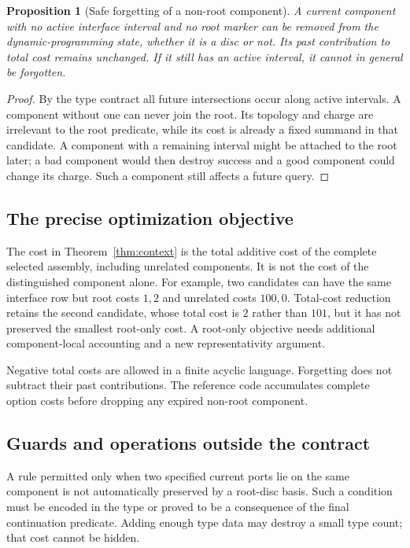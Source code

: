 \documentclass[11pt,letterpaper]{article}
\newtheorem{proposition}[theorem]{Proposition}
\theoremstyle{definition}
\begin{document}
\begin{proposition}[Safe forgetting of a non-root component]\label{prop:forget}
A current component with no active interface interval and no root marker can be removed from the dynamic-programming state, whether it is a disc or not. Its past contribution to total cost remains unchanged. If it still has an active interval, it cannot in general be forgotten.
\end{proposition}
\begin{proof}
By the type contract all future intersections occur along active intervals. A component without one can never join the root. Its topology and charge are irrelevant to the root predicate, while its cost is already a fixed summand in that candidate. A component with a remaining interval might be attached to the root later; a bad component would then destroy success and a good component could change its charge. Such a component still affects a future query.
\end{proof}

\subsection{The precise optimization objective}
The cost in Theorem~\ref{thm:context} is the total additive cost of the complete selected assembly, including unrelated components. It is not the cost of the distinguished component alone. For example, two candidates can have the same interface row but root costs $1,2$ and unrelated costs $100,0$. Total-cost reduction retains the second candidate, whose total cost is $2$ rather than $101$, but it has not preserved the smallest root-only cost. A root-only objective needs additional component-local accounting and a new representativity argument.

Negative total costs are allowed in a finite acyclic language. Forgetting does not subtract their past contributions. The reference code accumulates complete option costs before dropping any expired non-root component.

\subsection{Guards and operations outside the contract}
A rule permitted only when two specified current ports lie on the same component is not automatically preserved by a root-disc basis. Such a condition must be encoded in the type or proved to be a consequence of the final continuation predicate. Adding enough type data may destroy a small type count; that cost cannot be hidden.
\end{document}
